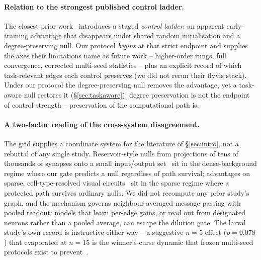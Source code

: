 \documentclass[10pt,twocolumn,letterpaper]{article}
\newcounter{auditbox}
\begin{document}
\paragraph{Relation to the strongest published control ladder.}
The closest prior work~\cite{toposens2026} introduces a staged \emph{control
ladder}: an apparent early-training advantage that disappears under shared
random initialisation and a degree-preserving null. Our protocol \emph{begins}
at that strict endpoint and supplies the axes their limitations name as future
work -- higher-order rungs, full convergence, corrected multi-seed statistics
-- plus an explicit record of which task-relevant edges each control preserves
(we did not rerun their flyvis stack). Under our protocol the degree-preserving
null removes the advantage, yet a task-aware null restores it
(\S\ref{sec:taskaware}): degree preservation is not the endpoint of control
strength -- preservation of the computational path is.

\begin{figure}[t]\centering{}\label{alg:audit}
\end{figure}

\paragraph{A two-factor reading of the cross-system disagreement.}
The grid supplies a coordinate system for the literature of
\S\ref{sec:intro}, not a rebuttal of any single study. Reservoir-style nulls
from projections of tens of thousands of synapses onto a small
input/output set~\cite{larvanull2026} sit in the dense-background regime where
our gate predicts a null regardless of path survival; advantages on sparse,
cell-type-resolved visual circuits~\cite{structurealone2026} sit in the sparse
regime where a protected path survives ordinary nulls. We did not recompute
any prior study's graph, and the mechanism governs neighbour-averaged message
passing with pooled readout: models that learn per-edge gains, or read out
from designated neurons rather than a pooled average, can escape the dilution
gate. The larval study's own record is instructive either way -- a suggestive
$n{=}5$ effect ($p{=}0.078$) that evaporated at $n{=}15$ is the winner's-curse
dynamic that frozen multi-seed protocols exist to prevent~\cite{larvanull2026}.
\end{document}
